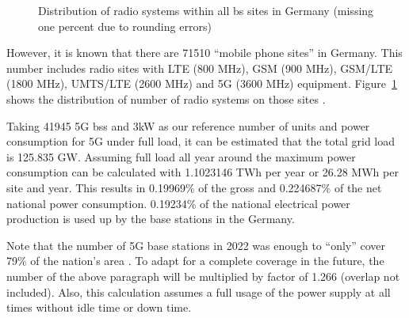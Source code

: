 \documentclass[11pt,a4paper]{article}
\begin{document}
\begin{figure}[h]
  \centering
  \caption{Distribution of radio systems within all \acrlong*{bs} sites in Germany \citep{EMF} (missing one percent due to rounding errors)}
  \label{fig:EMFdistribution}
\end{figure}

However, it is known that there are 71510 \enquote{mobile phone sites} in Germany.
This number includes radio sites with LTE (800 MHz), GSM (900 MHz), GSM/LTE (1800 MHz), UMTS/LTE (2600 MHz) and 5G (3600 MHz) equipment.
Figure~\ref{fig:EMFdistribution} shows the distribution of number of radio systems on those sites \citep{EMF}.

Taking 41945 5G \acrlong{bs}s and 3kW as our reference number of units and power consumption for 5G under full load, it can be estimated that the total grid load is 125.835 GW.
Assuming full load all year around the maximum power consumption can be calculated with 1.1023146 TWh per year or 26.28 MWh per site and year.
This results in 0.19969\% of the gross and 0.224687\% of the net national power consumption.
0.19234\% of the national electrical power production is used up by the base stations in the Germany.

Note that the number of 5G base stations in 2022 was enough to \enquote{only} cover 79\% of the nation's area \citep{5Gausbau}.
To adapt for a complete coverage in the future, the number of the above paragraph will be multiplied by factor of 1.266 (overlap not included).
Also, this calculation assumes a full usage of the power supply at all times without idle time or down time.
\end{document}
